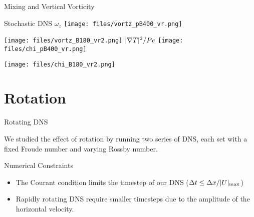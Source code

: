 \documentclass{beamer}
\begin{document}
\begin{frame}{Mixing and Vertical Vorticity }

        {\footnotesize\citep{Garaudal2024}}

        \vspace{100pt}

        {\footnotesize Stochastic DNS}
    \emp
        \centering
        $\omega_z$
        \texttt{[image: files/vortz\_pB400\_vr.png]}
        
        \texttt{[image: files/vortz\_B180\_vr2.png]}
    \emp
        \centering
        $|\nabla T|^2/Pe$
        \texttt{[image: files/chi\_pB400\_vr.png]}
        
        \texttt{[image: files/chi\_B180\_vr2.png]}
    \emp
    
\end{frame}

\section{Rotation}

\begin{frame}{Rotating DNS}

We studied the effect of rotation by running two series of DNS, each set with a fixed Froude number and varying Rossby number. 
    
\end{frame}

\begin{frame}{Numerical Constraints}
    \begin{itemize}
        \item The Courant condition limits the timestep of our DNS ($\Delta t \le \Delta x/|U|_{\rm max}$)
        \item Rapidly rotating DNS require smaller timesteps due to the amplitude of the horizontal velocity. 
    \end{itemize}
\end{frame}
 
\end{document}
